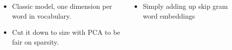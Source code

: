 \documentclass[a0paper, landscape]{tikzposter}
\begin{document}
\begin{columns}
        

    
	{
		{
			\begin{itemize}
				\item Classic model, one dimension per word in vocabulary.
				\item Cut it down to size with PCA to be fair on sparsity.
			\end{itemize}
			\par   	
		}
		\vspace{2ex}
		{
			\begin{itemize}
				\item Simply adding up skip gram word embeddings
			\end{itemize}
		     \small\cite{mikolovSkip}
		}

		\vspace{2ex}

}
\end{columns}
\end{document}
